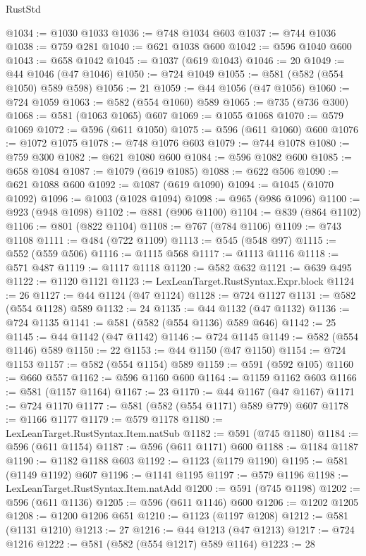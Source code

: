 \begin{lexlean}{RustStd}
\begin{coremodule}
@1034 := @1030 @1033
@1036 := @748 @1034 @603
@1037 := @744 @1036
@1038 := @759 @281
@1040 := @621 @1038 @600
@1042 := @596 @1040 @600
@1043 := @658 @1042
@1045 := @1037 (@619 @1043)
@1046 := 20
@1049 := @44 @1046 (@47 @1046)
@1050 := @724 @1049
@1055 := @581 (@582 (@554 @1050) @589 @598)
@1056 := 21
@1059 := @44 @1056 (@47 @1056)
@1060 := @724 @1059
@1063 := @582 (@554 @1060) @589
@1065 := @735 (@736 @300)
@1068 := @581 (@1063 @1065) @607
@1069 := @1055 @1068
@1070 := @579 @1069
@1072 := @596 (@611 @1050)
@1075 := @596 (@611 @1060) @600
@1076 := @1072 @1075
@1078 := @748 @1076 @603
@1079 := @744 @1078
@1080 := @759 @300
@1082 := @621 @1080 @600
@1084 := @596 @1082 @600
@1085 := @658 @1084
@1087 := @1079 (@619 @1085)
@1088 := @622 @506
@1090 := @621 @1088 @600
@1092 := @1087 (@619 @1090)
@1094 := @1045 (@1070 @1092)
@1096 := @1003 (@1028 @1094)
@1098 := @965 (@986 @1096)
@1100 := @923 (@948 @1098)
@1102 := @881 (@906 @1100)
@1104 := @839 (@864 @1102)
@1106 := @801 (@822 @1104)
@1108 := @767 (@784 @1106)
@1109 := @743 @1108
@1111 := @484 (@722 @1109)
@1113 := @545 (@548 @97)
@1115 := @552 (@559 @506)
@1116 := @1115 @568
@1117 := @1113 @1116
@1118 := @571 @487
@1119 := @1117 @1118
@1120 := @582 @632
@1121 := @639 @495
@1122 := @1120 @1121
@1123 := LexLeanTarget.RustSyntax.Expr.block
@1124 := 26
@1127 := @44 @1124 (@47 @1124)
@1128 := @724 @1127
@1131 := @582 (@554 @1128) @589
@1132 := 24
@1135 := @44 @1132 (@47 @1132)
@1136 := @724 @1135
@1141 := @581 (@582 (@554 @1136) @589 @646)
@1142 := 25
@1145 := @44 @1142 (@47 @1142)
@1146 := @724 @1145
@1149 := @582 (@554 @1146) @589
@1150 := 22
@1153 := @44 @1150 (@47 @1150)
@1154 := @724 @1153
@1157 := @582 (@554 @1154) @589
@1159 := @591 (@592 @105)
@1160 := @660 @557
@1162 := @596 @1160 @600
@1164 := @1159 @1162 @603
@1166 := @581 (@1157 @1164)
@1167 := 23
@1170 := @44 @1167 (@47 @1167)
@1171 := @724 @1170
@1177 := @581 (@582 (@554 @1171) @589 @779) @607
@1178 := @1166 @1177
@1179 := @579 @1178
@1180 := LexLeanTarget.RustSyntax.Item.natSub
@1182 := @591 (@745 @1180)
@1184 := @596 (@611 @1154)
@1187 := @596 (@611 @1171) @600
@1188 := @1184 @1187
@1190 := @1182 @1188 @603
@1192 := @1123 (@1179 @1190)
@1195 := @581 (@1149 @1192) @607
@1196 := @1141 @1195
@1197 := @579 @1196
@1198 := LexLeanTarget.RustSyntax.Item.natAdd
@1200 := @591 (@745 @1198)
@1202 := @596 (@611 @1136)
@1205 := @596 (@611 @1146) @600
@1206 := @1202 @1205
@1208 := @1200 @1206 @651
@1210 := @1123 (@1197 @1208)
@1212 := @581 (@1131 @1210)
@1213 := 27
@1216 := @44 @1213 (@47 @1213)
@1217 := @724 @1216
@1222 := @581 (@582 (@554 @1217) @589 @1164)
@1223 := 28

\end{coremodule}
\end{lexlean}
